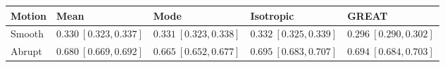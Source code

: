 \begin{tabular}{lllll}
\hline
Motion & Mean & Mode & Isotropic & GREAT \\
\hline
Smooth & $0.330\ [0.323,0.337]$ & $0.331\ [0.323,0.338]$ & $0.332\ [0.325,0.339]$ & $0.296\ [0.290,0.302]$ \\
Abrupt & $0.680\ [0.669,0.692]$ & $0.665\ [0.652,0.677]$ & $0.695\ [0.683,0.707]$ & $0.694\ [0.684,0.703]$ \\
\hline
\end{tabular}
